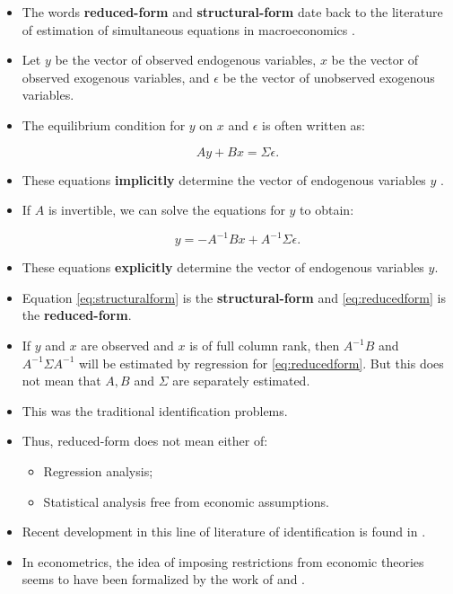 \documentclass[]{book}
\providecommand{\tightlist}{%
  \setlength{\itemsep}{0pt}\setlength{\parskip}{0pt}}
\begin{document}
\begin{itemize}
\tightlist
\item
  The words \textbf{reduced-form} and \textbf{structural-form} date back
  to the literature of estimation of simultaneous equations in
  macroeconomics \citep{Hsiao1983}.
\item
  Let \(y\) be the vector of observed endogenous variables, \(x\) be the
  vector of observed exogenous variables, and \(\epsilon\) be the vector
  of unobserved exogenous variables.
\item
  The equilibrium condition for \(y\) on \(x\) and \(\epsilon\) is often
  written as:

  \begin{equation}
  Ay + Bx = \Sigma \epsilon. \label{eq:structuralform}
  \end{equation}
\item
  These equations \textbf{implicitly} determine the vector of endogenous
  variables \(y\) .
\item
  If \(A\) is invertible, we can solve the equations for \(y\) to
  obtain:

  \begin{equation}
  y = - A^{-1} B x + A^{-1} \Sigma \epsilon. \label{eq:reducedform}
  \end{equation}
\item
  These equations \textbf{explicitly} determine the vector of endogenous
  variables \(y\).
\item
  Equation \eqref{eq:structuralform} is the \textbf{structural-form} and
  \eqref{eq:reducedform} is the \textbf{reduced-form}.
\item
  If \(y\) and \(x\) are observed and \(x\) is of full column rank, then
  \(A^{-1}B\) and \(A^{-1} \Sigma A^{-1}\) will be estimated by
  regression for \eqref{eq:reducedform}. But this does not mean that
  \(A, B\) and \(\Sigma\) are separately estimated.
\item
  This was the traditional identification problems.
\item
  Thus, reduced-form does not mean either of:

  \begin{itemize}
  \tightlist
  \item
    Regression analysis;
  \item
    Statistical analysis free from economic assumptions.
  \end{itemize}
\item
  Recent development in this line of literature of identification is
  found in \citet{Matzkin2007}.
\item
  In econometrics, the idea of imposing restrictions from economic
  theories seems to have been formalized by the work of
  \citet{Manski1994a} and \citet{Matzkin1994b}.
\end{itemize}
\end{document}
